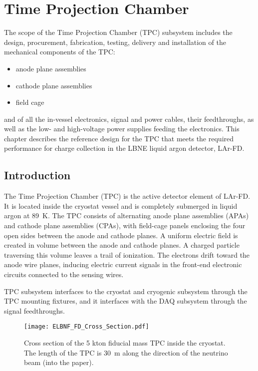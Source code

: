 \chapter{Time Projection Chamber}
\label{ch:tpc}

The scope of the Time Projection Chamber (TPC) subsystem includes the design, procurement, fabrication, testing, delivery and installation of the mechanical components of the TPC: 
\begin{itemize}
\item anode plane assemblies 
\item cathode plane assemblies
\item field cage
\end{itemize}
and of all the in-vessel electronics, signal and power cables, their feedthroughs, as well as the 
low- and high-voltage power supplies feeding the electronics.  This chapter describes the reference design for the TPC that meets the required performance for charge collection in the LBNE liquid argon detector, LAr-FD.

\section{Introduction}

The Time Projection Chamber (TPC) is the active detector element of LAr-FD. It is located inside the cryostat 
vessel and is completely submerged in liquid argon at 89~K. The TPC consists of alternating anode plane assemblies (APAs) and cathode plane assemblies (CPAs), with field-cage panels enclosing the four open sides between the anode and cathode planes.
A uniform electric field is created in volume between the anode and cathode planes. A charged particle traversing this volume leaves a trail of ionization.  The electrons drift toward the anode wire planes, inducing electric current signals in the front-end electronic circuits connected to the sensing wires.

TPC subsystem interfaces to the cryostat and cryogenic subsystem through the TPC mounting fixtures, 
and it interfaces with the DAQ subsystem through the signal feedthroughs.

\begin{figure}
\centering
\texttt{[image: ELBNF\_FD\_Cross\_Section.pdf]}
\caption[Cross section of the TPC inside the cryostat]{Cross section of the 5 kton fiducial mass TPC inside the cryostat.  The length of the TPC is  30~m along the direction of the neutrino beam (into the paper). }
\label{fig:tpc-xsect1}
\end{figure}

